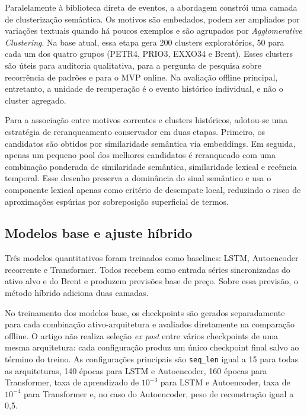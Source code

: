 \documentclass[conference]{IEEEtran}
\begin{document}
Paralelamente à biblioteca direta de eventos, a abordagem constrói uma camada de clusterização semântica. Os motivos são embedados, podem ser ampliados por variações textuais quando há poucos exemplos e são agrupados por \textit{Agglomerative Clustering}. Na base atual, essa etapa gera 200 clusters exploratórios, 50 para cada um dos quatro grupos (PETR4, PRIO3, EXXO34 e Brent). Esses clusters são úteis para auditoria qualitativa, para a pergunta de pesquisa sobre recorrência de padrões e para o MVP online. Na avaliação offline principal, entretanto, a unidade de recuperação é o evento histórico individual, e não o cluster agregado.

Para a associação entre motivos correntes e clusters históricos, adotou-se uma estratégia de reranqueamento conservador em duas etapas. Primeiro, os candidatos são obtidos por similaridade semântica via embeddings. Em seguida, apenas um pequeno pool dos melhores candidatos é reranqueado com uma combinação ponderada de similaridade semântica, similaridade lexical e recência temporal. Esse desenho preserva a dominância do sinal semântico e usa o componente lexical apenas como critério de desempate local, reduzindo o risco de aproximações espúrias por sobreposição superficial de termos.

\subsection{Modelos base e ajuste híbrido}

Três modelos quantitativos foram treinados como baselines: LSTM, Autoencoder recorrente e Transformer. Todos recebem como entrada séries sincronizadas do ativo alvo e do Brent e produzem previsões base de preço. Sobre essa previsão, o método híbrido adiciona duas camadas.

No treinamento dos modelos base, os checkpoints são gerados separadamente para cada combinação ativo-arquitetura e avaliados diretamente na comparação offline. O artigo não realiza seleção \textit{ex post} entre vários checkpoints de uma mesma arquitetura: cada configuração produz um único checkpoint final salvo ao término do treino. As configurações principais são \texttt{seq\_len} igual a 15 para todas as arquiteturas, 140 épocas para LSTM e Autoencoder, 160 épocas para Transformer, taxa de aprendizado de $10^{-3}$ para LSTM e Autoencoder, taxa de $10^{-4}$ para Transformer e, no caso do Autoencoder, peso de reconstrução igual a 0,5.
\end{document}
